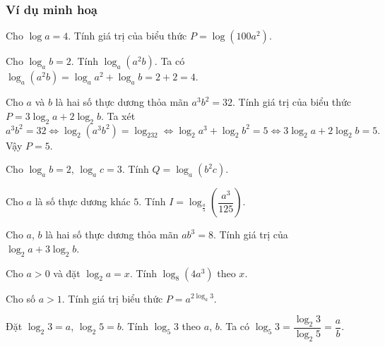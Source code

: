 \subsubsection{Ví dụ minh hoạ}
\begin{vd}
	Cho $\log a=4$. Tính giá trị của biểu thức $P=\log (100a^2)$.
\end{vd}
\begin{vd}
	Cho $\log_ab=2$. Tính $\log_a(a^2b)$.
	\loigiai
	{
		Ta có $\log_a(a^2b)=\log_aa^2+\log_ab=2+2=4$.
	}
\end{vd}
\begin{vd}
	Cho $a$ và $b$ là hai số thực dương thỏa mãn $a^3 b^2=32$. Tính giá trị của biểu thức $P=3\log _{2} a+2 \log _{2} b$.
	\loigiai
	{
		Ta xét
		$$a^3b^2=32\Leftrightarrow \log_2(a^3b^2)=\log_232\Leftrightarrow\log_2a^3+\log_2b^2=5\Leftrightarrow 3\log_2a+2\log_2b=5.$$
		Vậy $P=5$.
	}
\end{vd}
\begin{vd}
	Cho $\log_ab=2$, $\log_ac=3$. Tính $Q=\log_a\left(b^2c\right)$.
\end{vd}
\begin{vd}
	Cho $a$ là số thực dương khác $5.$ Tính $I=\log_{\tfrac{a}{5}}\left(\dfrac{a^{3}}{125}\right)$.
\end{vd}
\begin{vd}
	Cho $a$, $b$ là hai số thực dương thỏa mãn $a b^{3}=8$. Tính giá trị của $\log _2 a+3 \log _2 b$.
\end{vd}
\begin{vd}
	Cho $a>0$ và đặt $\log_2 a=x$. Tính $\log_8 (4a^3)$ theo $x$.
\end{vd}
\begin{vd}
	Cho số $a>1$. Tính giá trị biểu thức $P=a^{2\log_a3}$. 	
\end{vd}
\begin{vd}
	Đặt $\log_2 3=a$, $\log_2 5=b$. Tính $\log_5 3$ theo $a$, $b$.
	\loigiai
	{Ta có $\log_5 3=\dfrac{\log_2 3}{\log_2 5}=\dfrac{a}{b}$.
	}
\end{vd}
